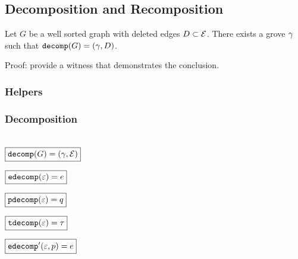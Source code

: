 \subsection{Decomposition and Recomposition}

\begin{theorem}
  Let $G$ be a well sorted graph with deleted edges $D \subset \E$.
  There exists a grove $\Grove$ such that $\decomp{G} = (\Grove, D)$.
\end{theorem}

Proof: provide a witness that demonstrates the conclusion.




\subsubsection{Helpers}

\figureDecompositionDefHelpersContent


\subsubsection{Decomposition}\hspace*{\fill} \\

\noindent $\boxed{\decomp{G} = (\Grove, \E)}$
%
\figureDecompositionDefDecomp

\noindent $\boxed{\edecomp{\e} = e}$
%
\figureDecompositionDefEdecomp

\noindent $\boxed{\pdecomp{\e} = q}$
%
\figureDecompositionDefPdecomp

\noindent $\boxed{\tdecomp{\e} = \tau}$
%
\figureDecompositionDefTdecomp

\noindent $\boxed{\edecompPrime{\e}{p} = e}$
%
\figureDecompositionDefEdecompPrime

